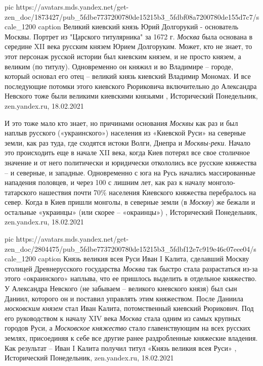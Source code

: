 \ifcmt
  pic https://avatars.mds.yandex.net/get-zen_doc/1873427/pub_5fdbe7737200780de15215b3_5fdbf08a7200780de155d7c7/scale_1200
  caption Великий киевский князь Юрий Долгорукий - основатель Москвы. Портрет из "Царского титулярника" за 1672 г.
\fi
\emph{Москва} была основана в середине XII века русским князем Юрием Долгоруким.
Может, кто не знает, то этот персонаж русской истории был киевским князем, и не
просто князем, а великим (по титулу). Одновременно он княжил и во Владимире –
городе, который основал его отец – великий князь киевский Владимир Мономах. И
все последующие потомки этого киевского Рюриковича включительно до Александра
Невского тоже были великими киевскими князьями
, 
Исторический Понедельник, zen.yandex.ru, 18.02.2021

И это тоже мало кто знает, но причинами основания \emph{Москвы} как раз и был наплыв
русского («украинского») населения из «Киевской Руси» на северные земли, как
раз туда, где сходятся истоки Волги, Днепра и \emph{Москвы-реки}. Начало это
происходить еще в начале XII века, когда Киев потерял все свое столичное
значение и от него политически и юридически откололись все русские княжества –
и северные, и западные.  Одновременно с юга на Русь начались массированные
нападения половцев, и через 100 с лишним лет, как раз к началу
монголо-татарского нашествия почти 70\% населения Киевского княжества
перебралось на север. Когда в Киев пришли монголы, в северные земли (в \emph{Москву})
же бежали и остальные «украинцы» (или скорее – «окраинцы»)
, 
Исторический Понедельник, zen.yandex.ru, 18.02.2021

\ifcmt
  pic https://avatars.mds.yandex.net/get-zen_doc/2804475/pub_5fdbe7737200780de15215b3_5fdbf12e7c919e46c07eee04/scale_1200
  caption Князь великия всея Руси Иван I Калита, сделавший Москву столицей Древнерусского государства
\fi
\emph{Москва} так быстро стала разрастаться из-за этого «окраинского» наплыва, что ее
пришлось выделить в отдельное княжество. У Александра Невского (не забываем –
великого киевского князя) был сын Даниил, которого он и поставил управлять этим
княжеством. После Даниила \emph{московским князем} стал Иван Калита, потомственный
киевский Рюрикович. Под его руководством к началу XIV века \emph{Москва} стала одним
из самых крупных городов Руси, а \emph{Московское княжество} стало главенствующим на
всех русских землях, присоединяя к себе все другие ранее раздробленные
княжеские владения. Как результат – Иван I Калита получил титул «Князь великия
всея Руси»
, 
Исторический Понедельник, zen.yandex.ru, 18.02.2021

